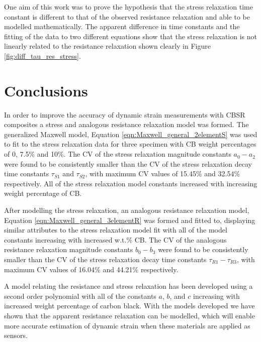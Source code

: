 One aim of this work was to prove the hypothesis that the stress relaxation time constant is different to that of the observed resistance relaxation and able to be modelled mathematically. The apparent difference in time constants and the fitting of the data to two different equations show that the stress relaxation is not linearly related to the resistance relaxation shown clearly in Figure \ref{fig:diff_tau_res_stress}.

\section{Conclusions}
In order to improve the accuracy of dynamic strain measurements with CBSR composites a stress and analogous resistance relaxation model was formed. The generalized Maxwell model, Equation \ref{eqn:Maxwell_general_2elementS} was used to fit to the stress relaxation data for three specimen with CB weight percentages of 0, 7.5\% and 10\%. The CV of the stress relaxation magnitude constants $a_0-a_2$ were found to be consistently smaller than the CV of the stress relaxation decay time constants $\tau_{S1}$ and $\tau_{S2}$, with maximum CV values of 15.45\% and 32.54\% respectively. All of the stress relaxation model constants increased with increasing weight percentage of CB.

After modelling the stress relaxation, an analogous resistance relaxation model, Equation \ref{eqn:Maxwell_general_3elementR} was formed and fitted to, displaying similar attributes to the stress relaxation model fit with all of the model constants increasing with increased w.t.\% CB. The CV of the analogous resistance relaxation magnitude constants $b_0-b_3$ were found to be consistently smaller than the CV of the stress relaxation decay time constants $\tau_{R1}-\tau_{R3}$, with maximum CV values of 16.04\% and 44.21\% respectively.

A model relating the resistance and stress relaxation has been developed using a second order polynomial with all of the constants $a$, $b$, and $c$ increasing with increased weight percentage of carbon black. With the models developed we have shown that the apparent resistance relaxation can be modelled, which will enable more accurate estimation of dynamic strain when these materials are applied as sensors. 
